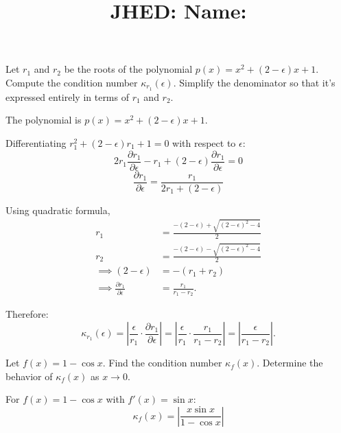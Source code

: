 \documentclass[reqno]{exam}
\title{\normalsize{
  JHED: \underline{\hspace{4cm}} \hspace{1em} Name: \underline{\hspace{9cm}}}
   }
\author{}
\date{}
\begin{document}
\maketitle
\vspace{-2cm} %

\begin{questions}

  \question
  Let $r_1$ and $r_2$ be the roots of the polynomial $p(x) = x^2 + (2 - \epsilon)x + 1$. Compute the condition number $\kappa_{r_1}(\epsilon)$. Simplify the denominator so that it's expressed entirely in terms of $r_1$ and $r_2$.

  \begin{solution}
    The polynomial is $p(x) = x^2 + (2 - \epsilon)x + 1$.

    Differentiating $r_1^2 + (2 - \epsilon)r_1 + 1 = 0$ with respect to $\epsilon$:
    $$2r_1\frac{\partial r_1}{\partial \epsilon} - r_1 + (2 - \epsilon)\frac{\partial r_1}{\partial \epsilon} = 0$$
    $$\frac{\partial r_1}{\partial \epsilon} = \frac{r_1}{2r_1 + (2 - \epsilon)}$$

    Using quadratic formula,
    \begin{align*}
      r_1                                             & = \frac{-(2 - \epsilon) + \sqrt{(2 - \epsilon)^2 - 4}}{2} \\
      r_2                                             & = \frac{-(2 - \epsilon) - \sqrt{(2 - \epsilon)^2 - 4}}{2} \\
      \implies
      (2 - \epsilon)                                  & = -(r_1 + r_2)                                            \\
      \implies \frac{\partial r_1}{\partial \epsilon} & = \frac{r_1}{r_1 - r_2}.
    \end{align*}


    Therefore:
    $$\kappa_{r_1}(\epsilon) = \left|\frac{\epsilon}{r_1} \cdot \frac{\partial r_1}{\partial \epsilon}\right| = \left|\frac{\epsilon}{r_1} \cdot \frac{r_1}{r_1-r_2}\right| = \left|\frac{\epsilon}{r_1-r_2}\right|.$$
  \end{solution}

  \newpage
  \question Let $f(x) = 1 - \cos x$. Find the condition number $\kappa_f(x)$. Determine the behavior of $\kappa_f(x)$ as $x \to 0$.
  \begin{solution}
    For $f(x) = 1 - \cos x$ with $f'(x) = \sin x$:
    $$\kappa_f(x) = \left|\frac{x \sin x}{1 - \cos x}\right|$$


\end{solution}
\end{questions}
\end{document}

